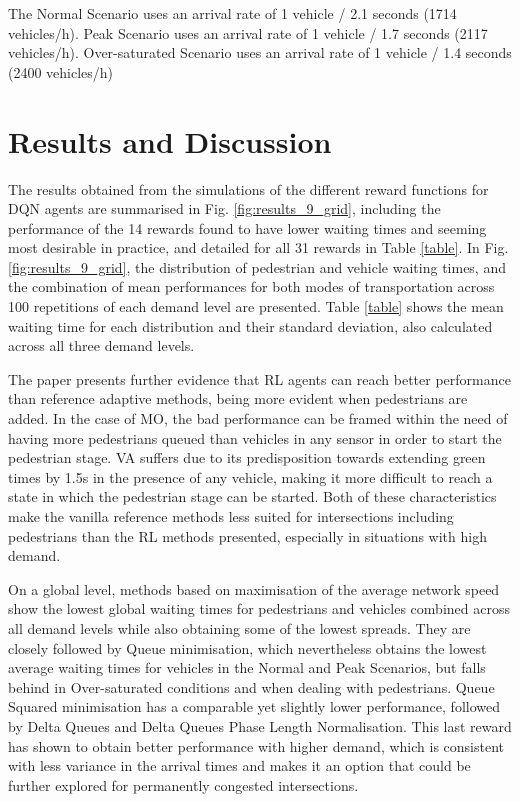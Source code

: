 \documentclass[conference]{IEEEtran}
\begin{document}
The Normal Scenario uses an arrival rate of 1 vehicle / 2.1 seconds (1714 vehicles/h). Peak Scenario uses an arrival rate of 1 vehicle / 1.7 seconds (2117 vehicles/h). Over-saturated Scenario uses an arrival rate of 1 vehicle / 1.4 seconds (2400 vehicles/h)


\section{Results and Discussion}
\label{results}
The results obtained from the simulations of the different reward functions for DQN agents are summarised in Fig. \ref{fig:results_9_grid}, including the performance of the 14 rewards found to have lower waiting times and seeming most desirable in practice, and detailed for all 31 rewards in Table \ref{table}.
In Fig. \ref{fig:results_9_grid}, the distribution of pedestrian and vehicle waiting times, and the combination of mean performances for both modes of transportation across 100 repetitions of each demand level are presented.
Table \ref{table} shows the mean waiting time for each distribution and their standard deviation, also calculated across all three demand levels. 

The paper presents further evidence that RL agents can reach better performance than reference adaptive methods, being more evident when pedestrians are added.
In the case of MO, the bad performance can be framed within the need of having more pedestrians queued than vehicles in any sensor in order to start the pedestrian stage.
VA suffers due to its predisposition towards extending green times by 1.5s in the presence of any vehicle, making it more difficult to reach a state in which the pedestrian stage can be started.
Both of these characteristics make the vanilla reference methods less suited for intersections including pedestrians than the RL methods presented, especially in situations with high demand.

On a global level, methods based on maximisation of the average network speed show the lowest global waiting times for pedestrians and vehicles combined across all demand levels while also obtaining some of the lowest spreads.
They are closely followed by Queue minimisation, which nevertheless obtains the lowest average waiting times for vehicles in the Normal and Peak Scenarios, but falls behind in Over-saturated conditions and when dealing with pedestrians.
Queue Squared minimisation has a comparable yet slightly lower performance, followed by Delta Queues and Delta Queues Phase Length Normalisation.
This last reward has shown to obtain better performance with higher demand, which is consistent with less variance in the arrival times and makes it an option that could be further explored for permanently congested intersections.
\end{document}

